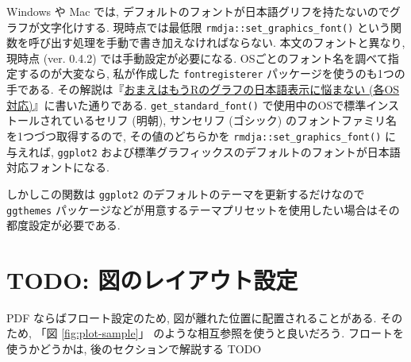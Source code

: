 \documentclass[
]{bxjsbook}
\newenvironment{Shaded}{\begin{snugshade}}{\end{snugshade}}
\newcommand{\AttributeTok}[1]{\textcolor[rgb]{0.77,0.63,0.00}{#1}}
\newcommand{\FunctionTok}[1]{\textcolor[rgb]{0.00,0.00,0.00}{#1}}
\newcommand{\NormalTok}[1]{#1}
\newcommand{\SpecialCharTok}[1]{\textcolor[rgb]{0.00,0.00,0.00}{#1}}
\theoremstyle{definition}
\theoremstyle{definition}
\theoremstyle{definition}
\theoremstyle{remark}
\begin{document}
Windows や Mac では,
デフォルトのフォントが日本語グリフを持たないのでグラフが文字化けする.
現時点では最低限 \texttt{rmdja::set\_graphics\_font()}
という関数を呼び出す処理を手動で書き加えなければならない.
本文のフォントと異なり, 現時点 (ver. 0.4.2) では手動設定が必要になる.
OSごとのフォント名を調べて指定するのが大変なら, 私が作成した
\texttt{fontregisterer} パッケージを使うのも1つの手である.
その解説は『\href{https://ill-identified.hatenablog.com/entry/2020/10/03/200618}{おまえはもうRのグラフの日本語表示に悩まない
(各OS対応)}』に書いた通りである. \texttt{get\_standard\_font()}
で使用中のOSで標準インストールされているセリフ (明朝), サンセリフ
(ゴシック) のフォントファミリ名を1つづつ取得するので, その値のどちらかを
\texttt{rmdja::set\_graphics\_font()} に与えれば, \texttt{ggplot2}
および標準グラフィックスのデフォルトのフォントが日本語対応フォントになる.

しかしこの関数は \texttt{ggplot2}
のデフォルトのテーマを更新するだけなので \texttt{ggthemes}
パッケージなどが用意するテーマプリセットを使用したい場合はその都度設定が必要である.

\begin{Shaded}
\end{Shaded}

\hypertarget{todo-ux56f3ux306eux30ecux30a4ux30a2ux30a6ux30c8ux8a2dux5b9a}{%
\section{TODO:
図のレイアウト設定}\label{todo-ux56f3ux306eux30ecux30a4ux30a2ux30a6ux30c8ux8a2dux5b9a}}

PDF ならばフロート設定のため, 図が離れた位置に配置されることがある.
そのため, 「図 \ref{fig:plot-sample}」
のような相互参照を使うと良いだろう. フロートを使うかどうかは,
後のセクションで解説する TODO
\end{document}

